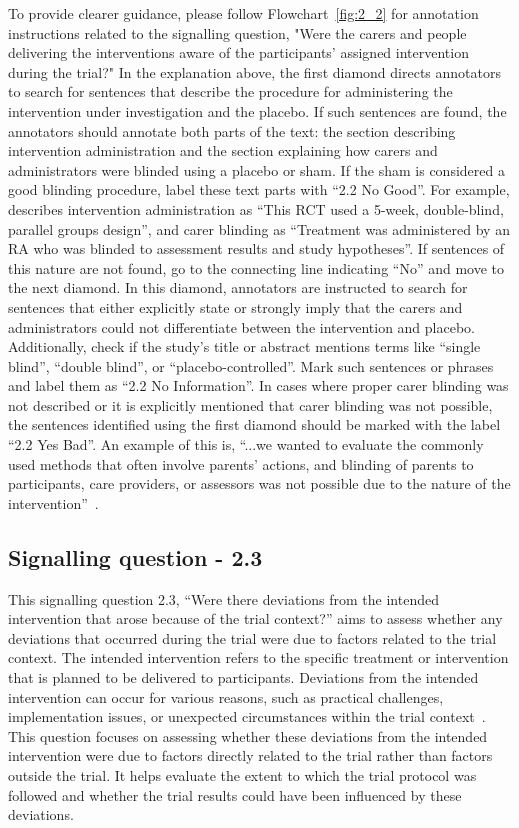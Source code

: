 \documentclass[sn-mathphys,Numbered]{sn-jnl}%
\begin{document}
To provide clearer guidance, please follow Flowchart~\ref{fig:2_2} for annotation instructions related to the signalling question, "Were the carers and people delivering the interventions aware of the participants' assigned intervention during the trial?"
In the explanation above, the first diamond directs annotators to search for sentences that describe the procedure for administering the intervention under investigation and the placebo.
If such sentences are found, the annotators should annotate both parts of the text: the section describing intervention administration and the section explaining how carers and administrators were blinded using a placebo or sham.
If the sham is considered a good blinding procedure, label these text parts with ``2.2 No Good''.
For example, \cite{chiaravalloti2020efficacy} describes intervention administration as ``This RCT used a 5-week, double-blind, parallel groups design'', and carer blinding as  ``Treatment was administered by an RA who was blinded to assessment results and study hypotheses''.
If sentences of this nature are not found, go to the connecting line indicating ``No'' and move to the next diamond.
In this diamond, annotators are instructed to search for sentences that either explicitly state or strongly imply that the carers and administrators could not differentiate between the intervention and placebo. Additionally, check if the study's title or abstract mentions terms like ``single blind'', ``double blind'', or ``placebo-controlled''.
Mark such sentences or phrases and label them as ``2.2 No Information''.
In cases where proper carer blinding was not described or it is explicitly mentioned that carer blinding was not possible, the sentences identified using the first diamond should be marked with the label ``2.2 Yes Bad''.
An example of this is, ``...we wanted to evaluate the commonly used methods that often involve parents' actions, and blinding of parents to participants, care providers, or assessors was not possible due to the nature of the intervention''~\cite{andersson2020effect}.



%
%
%
\subsection*{Signalling question - 2.3}
\label{subsec:2_3}
%
This signalling question 2.3, ``Were there deviations from the intended intervention that arose because of the trial context?'' aims to assess whether any deviations that occurred during the trial were due to factors related to the trial context.
The intended intervention refers to the specific treatment or intervention that is planned to be delivered to participants.
Deviations from the intended intervention can occur for various reasons, such as practical challenges, implementation issues, or unexpected circumstances within the trial context~\cite{paterson2019feasibility}.
This question focuses on assessing whether these deviations from the intended intervention were due to factors directly related to the trial rather than factors outside the trial.
It helps evaluate the extent to which the trial protocol was followed and whether the trial results could have been influenced by these deviations.
\end{document}
